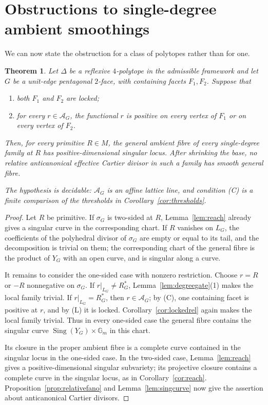 \documentclass[11pt]{amsart}
\newtheorem{theorem}{Theorem}[section]
\theoremstyle{definition}
\theoremstyle{remark}
\theoremstyle{plain}
\newcommand{\cA}{\mathcal{A}}
\newcommand{\Sing}{\operatorname{Sing}}
\begin{document}
\section{Obstructions to single-degree ambient smoothings}\label{sec:thmA}

We can now state the obstruction for a class of polytopes rather than for one.

\begin{theorem}\label{thm:Aprime}
Let $\Delta$ be a reflexive $4$-polytope in the admissible framework and let
$G$ be a unit-edge pentagonal $2$-face, with containing facets $F_1,F_2$.
Suppose that
\begin{enumerate}
\item[\rm(L)] both $F_1$ and $F_2$ are locked;
\item[\rm(C)] for every $r\in\cA_G$, the functional $r$ is positive on every
  vertex of $F_1$ or on every vertex of $F_2$.
\end{enumerate}
Then, for every primitive $R\in M$, the general ambient fibre of every
single-degree family at $R$ has positive-dimensional singular locus.  After
shrinking the base, no relative anticanonical effective Cartier divisor in
such a family has smooth general fibre.

The hypothesis is decidable: $\cA_G$ is an affine lattice line, and condition
{\rm(C)} is a finite comparison of the thresholds in
Corollary~\ref{cor:thresholds}.
\end{theorem}

\begin{proof}
Let $R$ be primitive.  If $\sigma_G$ is two-sided at $R$, Lemma~\ref{lem:reach}
already gives a singular curve in the corresponding chart.  If $R$ vanishes
on $L_G$, the coefficients of the polyhedral divisor of $\sigma_G$ are
empty or equal to its tail, and the decomposition is trivial on them; the
corresponding chart of the general fibre is the product of $Y_G$ with an open
curve, and is singular along a curve.

It remains to consider the one-sided case with nonzero restriction.  Choose
$r=R$ or $-R$ nonnegative on $\sigma_G$.  If
$r|_{L_G}\ne R_G^*$, Lemma~\ref{lem:degreegate}(1) makes the local family
trivial.  If $r|_{L_G}=R_G^*$, then $r\in\cA_G$; by (C), one containing facet
is positive at $r$, and by (L) it is locked.  Corollary~\ref{cor:lockedrel}
again makes the local family trivial.  Thus in every one-sided case the general
fibre contains the singular curve $\Sing(Y_G)\times\mathbb G_m$ in this chart.

Its closure in the proper ambient fibre is a complete curve contained in the
singular locus in the one-sided case.  In the two-sided case,
Lemma~\ref{lem:reach} gives a positive-dimensional singular subvariety; its
projective closure contains a complete curve in the singular locus, as in
Corollary~\ref{cor:reach}.  Proposition~\ref{prop:relativefano} and
Lemma~\ref{lem:singcurve} now give the assertion about anticanonical Cartier
divisors.
\end{proof}
\end{document}
